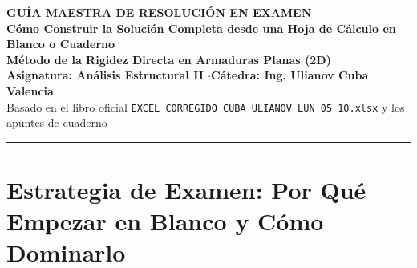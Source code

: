 \documentclass[10pt,a4paper]{article}
\begin{document}
\begin{center}
    {\Huge\bfseries\color{primaryDark} GUÍA MAESTRA DE RESOLUCIÓN EN EXAMEN}\\[0.25cm]
    {\Large\bfseries\color{profBlue} Cómo Construir la Solución Completa desde una Hoja de Cálculo en Blanco o Cuaderno}\\[0.2cm]
    {\large\bfseries Método de la Rigidez Directa en Armaduras Planas (2D)}\\[0.3cm]
    {\normalsize\bfseries Asignatura: Análisis Estructural II \quad$\cdot$\quad Cátedra: Ing. Ulianov Cuba Valencia}\\[0.15cm]
    {\small\color{gray} Basado en el libro oficial \texttt{EXCEL CORREGIDO CUBA ULIANOV LUN 05 10.xlsx} y los apuntes de cuaderno}
\end{center}

\vspace{-0.2cm}
\noindent\rule{\textwidth}{1.5pt}

\begin{abstract}
\noindent Esta guía técnica y pedagógica fue diseñada para responder a la indicación del profesor: \textbf{``En el examen no se usará ninguna plantilla prehecha; el estudiante debe construir el análisis en una hoja de Excel totalmente en blanco o a mano en el cuaderno''}. Se explica paso a paso, cuadro por cuadro, qué colocar en cada columna y fila, cuáles son las fórmulas exactas nativas de Excel en español e inglés para automatizar el cálculo sin cometer errores humanos, cómo trasladar las matrices locales a la matriz global sin confusiones, cómo invertir la submatriz y calcular reacciones, y cómo determinar los esfuerzos axiales finales con su verificación de equilibrio estático. Incluye el ejercicio resuelto en clase del lunes 05/10 (4 nudos, 5 barras) con todos sus números verificados celda por celda.
\end{abstract}

\tableofcontents
\newpage

\section{Estrategia de Examen: Por Qué Empezar en Blanco y Cómo Dominarlo}
\end{document}
